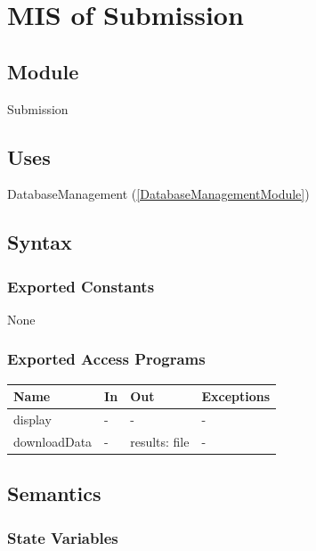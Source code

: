 \documentclass[12pt, titlepage]{article}
\begin{document}
\newpage

\section{MIS of Submission} \label{SubmissionModule}

\subsection{Module}

Submission

\subsection{Uses}

DatabaseManagement (\ref{DatabaseManagementModule})

\subsection{Syntax}

\subsubsection{Exported Constants}

None

\subsubsection{Exported Access Programs}

\begin{center}
\begin{tabular}{p{3cm} p{3cm} p{4cm} p{2cm}}
\hline
\textbf{Name} & \textbf{In} & \textbf{Out} & \textbf{Exceptions} \\
\hline
display & - & - & - \\
downloadData & - & results: file & - \\
\hline
\end{tabular}
\end{center}

\subsection{Semantics}

\subsubsection{State Variables}
\end{document}
